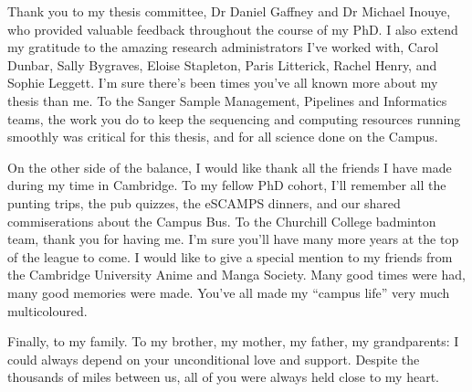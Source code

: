 Thank you to my thesis committee, Dr Daniel Gaffney and Dr Michael Inouye, who provided valuable feedback throughout the course of my PhD.
I also extend my gratitude to the amazing research administrators I've worked with, Carol Dunbar, Sally Bygraves, Eloise Stapleton, Paris Litterick, Rachel Henry, and Sophie Leggett.
I'm sure there's been times you've all known more about my thesis than me. 
To the Sanger Sample Management, Pipelines and Informatics teams,
the work you do to keep the sequencing and computing resources running smoothly was critical for this thesis, and for all science done on the Campus.

On the other side of the balance, I would like thank all the friends I have made during my time in Cambridge.
To my fellow PhD cohort, 
I'll remember all the punting trips, the pub quizzes, the eSCAMPS dinners,
and our shared commiserations about the Campus Bus.
To the Churchill College badminton team, thank you for having me. I'm sure you'll have many more years at the top of the league to come.
I would like to give a special mention to my friends from the Cambridge University Anime and Manga Society.
Many good times were had, many good memories were made.
You've all made my \enquote{campus life} very much multicoloured.

Finally, to my family.
To my brother, my mother, my father, my grandparents:
I could always depend on your unconditional love and support.
Despite the thousands of miles between us, 
all of you were always held close to my heart.

